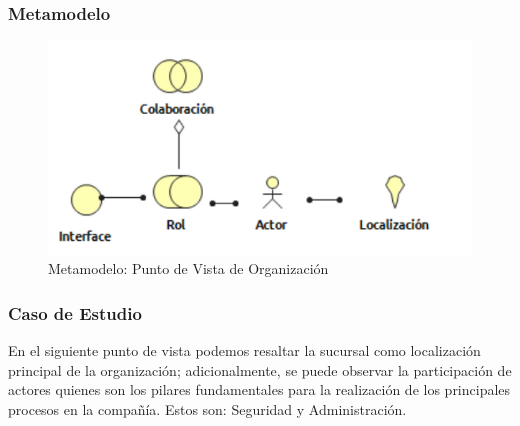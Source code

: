 \subsubsection{Metamodelo}
\begin{figure}[H]
	\centering
	\includegraphics[width=1.0\textwidth]{imagenes/Metamodelos/Negocio/meta_organizacion.PDF}
	\caption{Metamodelo: Punto de Vista de Organización}
	\label{fig:gap_analysis}
\end{figure}

\subsubsection{Caso de Estudio}
En el siguiente punto de vista podemos resaltar la sucursal como localización principal de la organización; adicionalmente, se puede observar la participación de actores quienes son los pilares fundamentales para la realización de los principales procesos en la compañía. Estos son: Seguridad y Administración.

